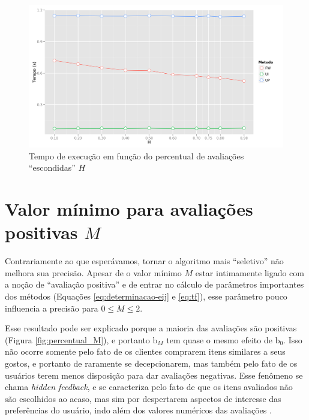 \begin{figure}[htp]
    \begin{center}
    \includegraphics[width=1\textwidth]{img/time_H}
    \end{center}
    \caption{Tempo de execução em função do percentual de avaliações ``escondidas'' $H$}
    \label{fig:time_H}
\end{figure}


\section{Valor mínimo para avaliações positivas $M$} %
\label{sec:valor_m_nimo_para_avalia_es_positivas_}

Contrariamente ao que esperávamos, tornar o algoritmo mais ``seletivo'' não melhora sua precisão. Apesar de o valor mínimo $M$ estar intimamente ligado com a noção de ``avaliação positiva'' e de entrar no cálculo de parâmetros importantes dos métodos (Equações \ref{eq:determinacao-eij} e \ref{eq:tf}), esse parâmetro pouco influencia a precisão para $0 \leq M \leq 2$. 

Esse resultado pode ser explicado porque a maioria das avaliações são positivas (Figura \ref{fig:percentual_M}), e portanto $\mathrm{b}_M$ tem quase o mesmo efeito de $\mathrm{b}_0$. Isso não ocorre somente pelo fato de os clientes comprarem itens similares a seus gostos, e portanto de raramente se decepcionarem, mas também pelo fato de os usuários terem menos disposição para dar avaliações negativas. Esse fenômeno se chama \textit{hidden feedback}, e se caracteriza pelo fato de que os itens avaliados não são escolhidos ao acaso, mas sim por despertarem aspectos de interesse das preferências do usuário, indo além dos valores numéricos das avaliações \cite{lops2011content-chap5}.

